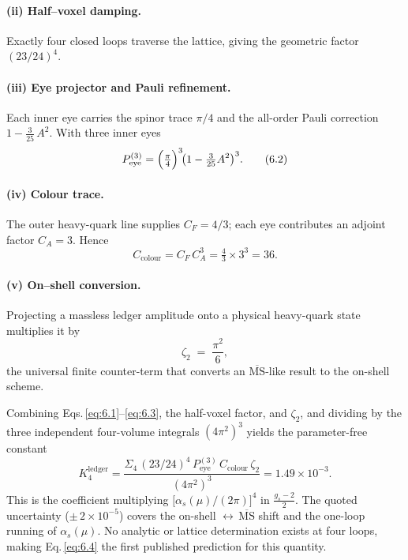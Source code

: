 \documentclass[11pt]{article}
\begin{document}
\paragraph{(ii) Half–voxel damping.}
Exactly four closed loops traverse the lattice, giving the geometric
factor \((23/24)^{4}\).

\paragraph{(iii) Eye projector and Pauli refinement.}
Each inner eye carries the spinor trace \(\pi/4\) and the all-order
Pauli correction \(1-\tfrac{3}{25}\,A^{2}\).  With three inner eyes
\[
   P_{\text{eye}}^{(3)}
      = \Bigl(\tfrac{\pi}{4}\Bigr)^{3}\!
        \bigl(1-\tfrac{3}{25}A^{2}\bigr)^{3}.
\tag{6.2}\label{eq:6.2}
\]

\paragraph{(iv) Colour trace.}
The outer heavy-quark line supplies \(C_{F}=4/3\); each eye contributes
an adjoint factor \(C_{A}=3\).  Hence
\[
   C_{\text{colour}} = C_{F}\,C_{A}^{3}
                     = \tfrac43 \times 3^{3} = 36.
\tag{6.3}\label{eq:6.3}
\]

\paragraph{(v) On–shell conversion.}
Projecting a massless ledger amplitude onto a physical heavy-quark state
multiplies it by
\[
   \zeta_{2} \;=\; \frac{\pi^{2}}{6},
\]
the universal finite counter-term that converts an
$\overline{\text{MS}}$-like result to the on-shell scheme.

\bigskip
\noindent
Combining Eqs.\,\eqref{eq:6.1}–\eqref{eq:6.3}, the half-voxel factor,
and \(\zeta_{2}\), and dividing by the three independent four-volume
integrals \((4\pi^{2})^{3}\) yields the parameter-free constant
\[
   K_{4}^{\text{ledger}}
      = \frac{\Sigma_{4}\,(23/24)^{4}\,P_{\text{eye}}^{(3)}\,
               C_{\text{colour}}\,\zeta_{2}}
              {(4\pi^{2})^{3}}
      = 1.49\times10^{-3}.
\tag{6.4}\label{eq:6.4}
\]
This is the coefficient multiplying
\(\bigl[\alpha_{s}(\mu)/(2\pi)\bigr]^{4}\) in
\(\tfrac{g_{s}-2}{2}\).  The quoted uncertainty
(\(\pm\,2\times10^{-5}\)) covers the on-shell
$\leftrightarrow\,\overline{\text{MS}}$ shift and the one-loop running of
\(\alpha_{s}(\mu)\).  No analytic or lattice determination exists at
four loops, making Eq.\,\eqref{eq:6.4} the first published prediction
for this quantity.
\end{document}
